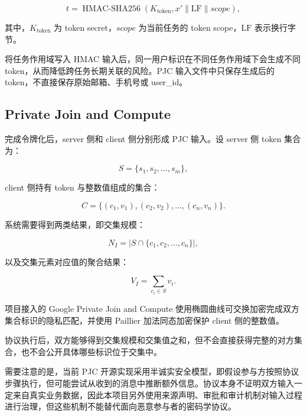 \documentclass[UTF8,a4paper,12pt,oneside]{ctexrep}
\begin{document}
\begin{equation}
t=
\operatorname{HMAC\text{-}SHA256}
\left(
K_{\mathrm{token}},
x'\parallel\mathrm{LF}\parallel scope
\right),
\end{equation}

其中，$K_{\mathrm{token}}$ 为 token secret，$scope$ 为当前任务的 token scope，$\mathrm{LF}$ 表示换行字节。

将任务作用域写入 HMAC 输入后，同一用户标识在不同任务作用域下会生成不同 token，从而降低跨任务长期关联的风险。PJC 输入文件中只保存生成后的 token，不直接保存原始邮箱、手机号或 user\_id。

\subsection{Private Join and Compute}

完成令牌化后，server 侧和 client 侧分别形成 PJC 输入。设 server 侧 token 集合为：

\begin{equation}
S=\{s_1,s_2,\ldots,s_m\},
\end{equation}

client 侧持有 token 与整数值组成的集合：

\begin{equation}
C=\{(c_1,v_1),(c_2,v_2),\ldots,(c_n,v_n)\}.
\end{equation}

系统需要得到两类结果，即交集规模：

\begin{equation}
N_I=
\left|
S\cap\{c_1,c_2,\ldots,c_n\}
\right|,
\end{equation}

以及交集元素对应值的聚合结果：

\begin{equation}
V_I=
\sum_{c_i\in S}v_i.
\end{equation}

项目接入的 Google Private Join and Compute 使用椭圆曲线可交换加密完成双方集合标识的隐私匹配，并使用 Paillier 加法同态加密保护 client 侧的整数值。

协议执行后，双方能够得到交集规模和交集值之和，但不会直接获得完整的对方集合，也不会公开具体哪些标识位于交集中。

需要注意的是，当前 PJC 开源实现采用半诚实安全模型，即假设参与方按照协议步骤执行，但可能尝试从收到的消息中推断额外信息。协议本身不证明双方输入一定来自真实业务数据，因此本项目另外使用来源声明、审批和审计机制对输入过程进行治理，但这些机制不能替代面向恶意参与者的密码学协议。
\end{document}

